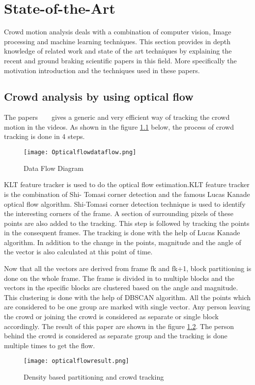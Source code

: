 \chapter{State-of-the-Art}
Crowd motion analysis deals with a combination of computer vision, Image processing and machine 
learning techniques. This section provides in depth knowledge of related work and state of the art 
techniques by explaining the recent and ground braking scientific papers in this field. More specifically 
the motivation introduction and the techniques used in these papers.
\section{Crowd analysis by using optical flow}
The papers ~\cite{santoro2010crowd} ~\cite{rosandic2019crowd} gives a generic and very efficient way 
of tracking the crowd motion in the videos. As shown in the figure \ref{fig:opticaldataflow} below, the 
process of crowd tracking is done in 4 steps. 
\begin{figure}[tb]
	\center\texttt{[image: Opticalflowdataflow.png]}
	\caption{Data Flow Diagram}
	\label{fig:opticaldataflow}
\end{figure}
KLT feature tracker is used to do the optical flow estimation.KLT feature tracker is the combination of Shi-
Tomasi corner detection and the famous Lucas Kanade optical flow algorithm. Shi-Tomasi corner 
detection technique is used to identify the interesting corners of the frame. A section of surrounding 
pixels of these points are also added to the tracking. This step is followed by tracking the points in the consequent frames. The tracking is done with the help of Lucas Kanade algorithm. In addition to the change in the points, magnitude and the angle of the vector is also calculated at this point of time.

Now that all the vectors are derived from frame fk and fk+1, block partitioning is done on the whole frame. The frame is divided in to multiple blocks and the vectors in the specific blocks are clustered based on the angle and magnitude. This clustering is done with the help of DBSCAN algorithm. All the points which are considered to be one group are marked with single vector. Any person leaving the crowd or joining the crowd is considered as separate or single block accordingly. The result of this paper are shown in the figure \ref{fig:opticalflowresult}. The person behind the crowd is considered as separate group and the tracking is done multiple times to get the flow.
\begin{figure}[tb]
	\center\texttt{[image: opticalflowresult.png]}
	\caption{Density based partitioning and crowd tracking}
	\label{fig:opticalflowresult}
\end{figure}

